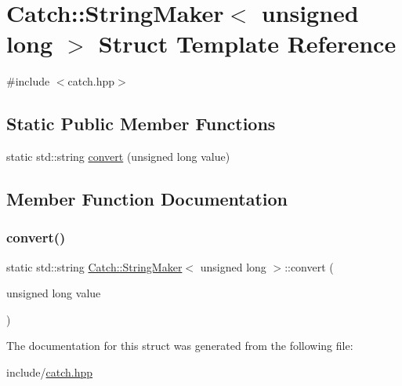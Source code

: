 \hypertarget{structCatch_1_1StringMaker_3_01unsigned_01long_01_4}{}\section{Catch\+:\+:String\+Maker$<$ unsigned long $>$ Struct Template Reference}
\label{structCatch_1_1StringMaker_3_01unsigned_01long_01_4}


{\ttfamily \#include $<$catch.\+hpp$>$}

\subsection*{Static Public Member Functions}
\begin{DoxyCompactItemize}
\item 
static std\+::string \mbox{\hyperlink{structCatch_1_1StringMaker_3_01unsigned_01long_01_4_ae105dc97e4462a86a61b59667f8423c9}{convert}} (unsigned long value)
\end{DoxyCompactItemize}


\subsection{Member Function Documentation}
\mbox{\label{structCatch_1_1StringMaker_3_01unsigned_01long_01_4_ae105dc97e4462a86a61b59667f8423c9}} 
\subsubsection{\texorpdfstring{convert()}{convert()}}
{\footnotesize\ttfamily static std\+::string \mbox{\hyperlink{structCatch_1_1StringMaker}{Catch\+::\+String\+Maker}}$<$ unsigned long $>$\+::convert (\begin{DoxyParamCaption}\item[{unsigned long}]{value }\end{DoxyParamCaption})\hspace{0.3cm}{\ttfamily [static]}}



The documentation for this struct was generated from the following file\+:\begin{DoxyCompactItemize}
\item 
include/\mbox{\hyperlink{catch_8hpp}{catch.\+hpp}}\end{DoxyCompactItemize}
